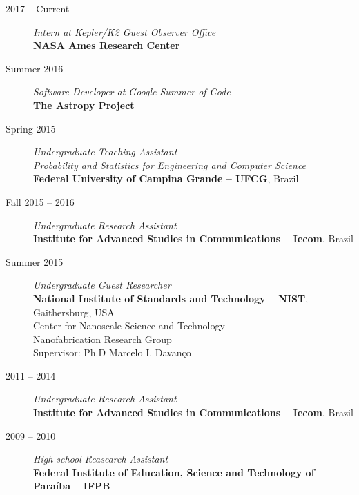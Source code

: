 \documentclass[10pt]{article}
\begin{document}
\begin{titlepage}
\begin{description}
\item[2017 -- Current] \emph{Intern at Kepler/K2 Guest Observer Office}
\\\textbf{NASA Ames Research Center}
\item[Summer 2016] \emph{Software Developer at Google Summer of Code}
\\\textbf{The Astropy Project}
\item[Spring 2015] \emph{Undergraduate Teaching Assistant}
\\\emph{Probability and Statistics for Engineering and Computer Science}
\\\textbf{Federal University of Campina Grande -- UFCG}, Brazil
\item[Fall 2015 -- 2016] \emph{Undergraduate Research Assistant}
\\\textbf{Institute for Advanced Studies in Communications -- Iecom}, Brazil
\item[Summer 2015] \emph{Undergraduate Guest Researcher}
\\\textbf{National Institute of Standards and Technology -- NIST}, Gaithersburg, USA
\\Center for Nanoscale Science and Technology
\\Nanofabrication Research Group
\\Supervisor: Ph.D Marcelo I. Davan\c co
\item[2011 -- 2014] \emph{Undergraduate Research Assistant}
\\\textbf{Institute for Advanced Studies in Communications -- Iecom}, Brazil
\item[2009 -- 2010] \emph{High-school Reasearch Assistant}
\\\textbf{Federal Institute of Education, Science and Technology of Para\'iba -- IFPB}
\end{description}


\end{titlepage}
\end{document}
